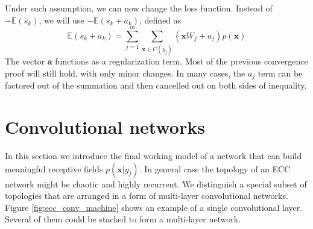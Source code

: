 \documentclass[12pt]{article}
\begin{document}
Under such assumption, we can now change the loss function. Instead of $-\mathbb{E}(s_k)$, we will use 
$-\mathbb{E}(s_k+a_k)$, defined as
\[
\mathbb{E}(s_k+a_k) = \sum_{j=1}^{m} \sum_{\boldsymbol{x}\in C(y_j)} (\boldsymbol{x}W_j +a_j)p(\boldsymbol{x})
\]
The vector $\boldsymbol{a}$ functions as a regularization term. Most of the previous convergence proof will still hold, with only minor changes. In many cases, the $a_j$ term can be factored out of the summation and then cancelled out on both sides of inequality. 



\section{Convolutional networks}

In this section we introduce the final working model of a network that can build meaningful receptive fields $p(\boldsymbol{x}|y_j)$. In general case the topology of an ECC network might be chaotic and highly recurrent. We distinguish a special subset of topologies that are arranged in a form of multi-layer convolutional networks. Figure \ref{fig:ecc_conv_machine} shows an example of a single convolutional layer. Several of them could be stacked to form a multi-layer network. 
\end{document}

